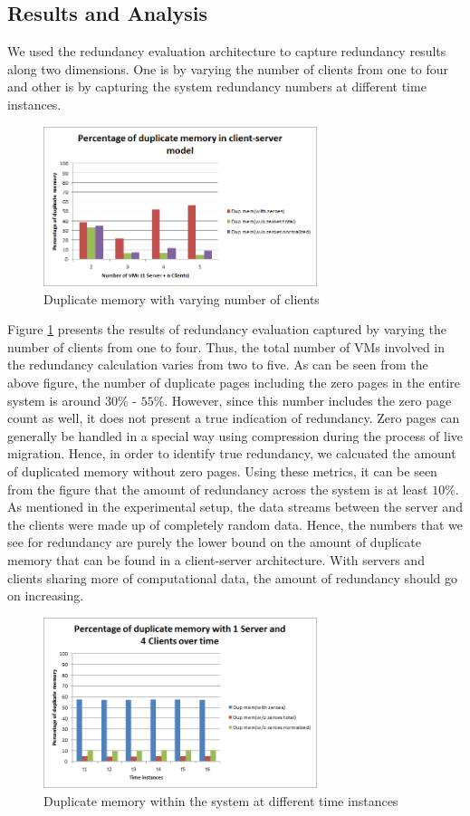 \documentclass{acm_proc_article-sp}
\begin{document}
\subsection{Results and Analysis}
We used the redundancy evaluation architecture to capture redundancy results along two dimensions. One is by varying the number of clients from one to four and other is by capturing the system redundancy numbers at different time instances.

\begin{figure}[htbp]
\centering
        \includegraphics[width=8cm]{client-server1.png}
    \caption{Duplicate memory with varying number of clients}
    \label{fig:client-server1}
\end{figure}

Figure \ref{fig:client-server1} presents the results of redundancy evaluation captured by varying the number of clients from one to four. Thus, the total number of VMs involved in the redundancy calculation varies from two to five. As can be seen from the above figure, the number of duplicate pages including the zero pages in the entire system is around $30$\% - $55$\%.	However, since this number includes the zero page count as well, it does not present a true indication of redundancy. Zero pages can generally be handled in a special way using compression during the process of live migration. Hence, in order to identify true redundancy, we calcuated the amount of duplicated memory without zero pages. Using these metrics, it can be seen from the figure that the amount of redundancy across the system is at least $10$\%. As mentioned in the experimental setup, the data streams between the server and the clients were made up of completely random data. Hence, the numbers that we see for redundancy are purely the lower bound on the amount of duplicate memory that can be found in a client-server architecture. With servers and clients sharing more of computational data, the amount of redundancy should go on increasing.

\begin{figure}[htbp]
\centering
        \includegraphics[width=8cm]{client-server2.png}
    \caption{Duplicate memory within the system at different time instances}
    \label{fig:client-server2}
\end{figure}
\end{document}
